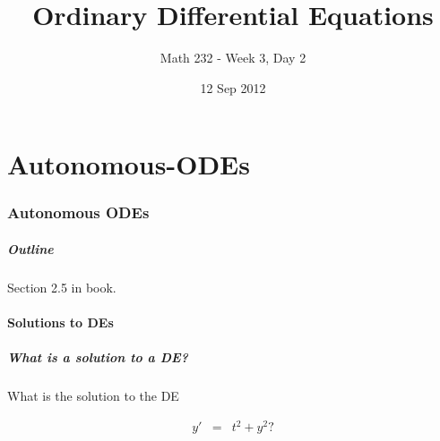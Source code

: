 \part{Autonomous-ODEs}
\section{Autonomous ODEs}

\title{Ordinary Differential Equations}
\subtitle{Math 232 - Week 3, Day 2}
\date{12 Sep 2012}

\begin{frame}
  \titlepage
\end{frame}

\begin{frame}
  \frametitle{Outline}

  Section 2.5 in book.
\end{frame}


\subsection{Solutions to DEs}


\begin{frame}
  \frametitle{What is a solution to a DE?}

  What is the solution to the DE

  \begin{eqnarray*}
    y' & = & t^2 + y^2?
  \end{eqnarray*}



\end{frame}


